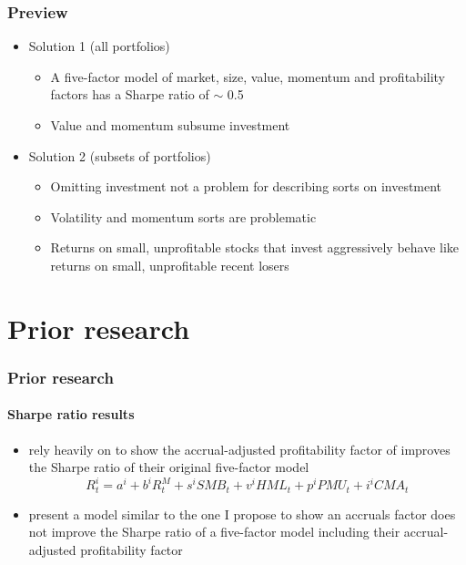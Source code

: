 \documentclass[notes]{beamer}  %
\begin{document}
\begin{frame} \frametitle{Preview}
  \begin{itemize}
    \item Solution 1 (all portfolios)
    \begin{itemize}
      \item A five-factor model of market, size, value, momentum and
      profitability factors has a Sharpe ratio of $\sim$ 0.5
      \item Value and momentum subsume investment
    \end{itemize}
    \item Solution 2 (subsets of portfolios)
    \begin{itemize}
      \item Omitting investment not a problem for describing sorts on investment
      \item Volatility and momentum sorts are problematic
      \item Returns on small, unprofitable stocks that invest
      aggressively behave like returns on small, unprofitable recent losers
    \end{itemize}
  \end{itemize}
\end{frame}


\section{Prior research}

\begin{frame} \frametitle{Prior research} \framesubtitle{Sharpe ratio results}
  \begin{itemize}
    \item \textcite{fama2016choosing} rely heavily on
    \textcite{barillas2016alpha} to show the accrual-adjusted profitability
    factor of \textcite{ball2016accruals} improves the Sharpe ratio of their
    original five-factor model \parencite{fama2015five}
    \begin{equation}
      R_t^i=a^i + b^iR_t^M + s^iSMB_t + v^iHML_t + p^iPMU_t + i^iCMA_t
    \end{equation}
    \item \textcite{ball2016accruals} present a model similar to the one I
    propose to show an accruals factor does not improve the Sharpe ratio of a
    five-factor model including their accrual-adjusted profitability factor
  \end{itemize}
\end{frame}
\end{document}
